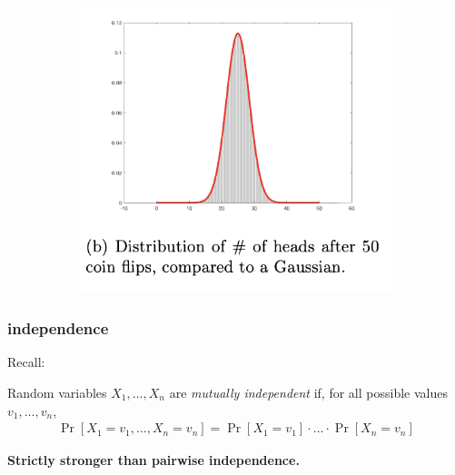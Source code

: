 \documentclass[compress]{beamer}
\begin{document}
\begin{frame}
\begin{figure}
\begin{subfigure}[t]{0.4\textwidth}
			\includegraphics[width=\textwidth]{cltSkinny.png}
		\end{subfigure}
	\end{figure}
\end{frame}

\begin{frame}
	\frametitle{independence}
	Recall:
	\vspace{1em}
	\begin{definition}
		Random variables $X_1, \ldots, X_n$ are \emph{mutually independent} if, for all possible values $v_1, \ldots, v_n$,
		\begin{align*}
			\Pr[X_1 = v_1, \ldots, X_n = v_n] = 	\Pr[X_1 = v_1]\cdot\ldots \cdot\Pr[X_n = v_n]
		\end{align*}
	\end{definition}
	\begin{center}
		\textbf{Strictly stronger than pairwise independence.}
	\end{center}
\end{frame}
\end{document}
